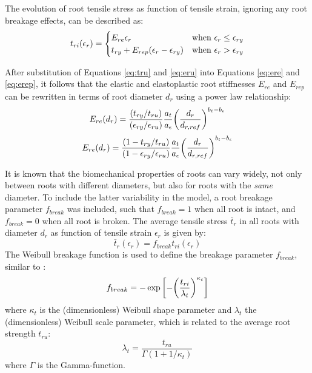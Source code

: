 \documentclass[a4 paper, 11  pt]{article}
\begin{document}
The evolution of root tensile stress as function of tensile strain, ignoring any root breakage effects, can be described as:
\begin{equation}
	t_{ri}(\epsilon_r) = 
	\begin{cases}
		E_{re} \epsilon_r & \text{when } \epsilon_r \leq \epsilon_{ry} \\
		t_{ry} + E_{rep} \qty(\epsilon_r - \epsilon_{ry}) & \text{when } \epsilon_r > \epsilon_{ry}
	\end{cases}
	\label{eq:tri}
\end{equation}

After substitution of Equations \ref{eq:tru} and \ref{eq:eru} into Equations \ref{eq:ere} and \ref{eq:erep}, it follows that the elastic and elastoplastic root stiffnesses $E_{re}$ and $E_{rep}$ can be rewritten in terms of root diameter $d_r$ using a power law relationship:
\begin{equation}
	E_{re}(d_r) = \frac{\qty(t_{ry}/t_{ru})}{\qty(\epsilon_{ry}/\epsilon_{ru})} \frac{a_t}{a_\epsilon} \qty(\frac{d_r}{d_{r,ref}})^{b_t - b_\epsilon}
\end{equation}
\begin{equation}
	E_{re}(d_r) = \frac{\qty(1 - t_{ry}/t_{ru})}{\qty(1 - \epsilon_{ry}/\epsilon_{ru})} \frac{a_t}{a_\epsilon} \qty(\frac{d_r}{d_{r,ref}})^{b_t - b_\epsilon}
\end{equation}

It is known that the biomechanical properties of roots can vary widely, not only between roots with different diameters, but also for roots with the \textit{same} diameter. To include the latter variability in the model, a root breakage parameter $f_{break}$ was included, such that $f_{break}=1$ when all root is intact, and $f_{break}=0$ when all root is broken. The average tensile stress $\bar{t}_r$ in all roots with diameter $d_r$ as function of tensile strain $\epsilon_r$ is given by:
\begin{equation}
	\bar{t}_r(\epsilon_r) = f_{break} t_{ri}(\epsilon_r)
\end{equation}
The Weibull breakage function is used to define the breakage parameter $f_{break}$, similar to \citet{schwarz2013}:
\begin{equation}
	f_{break} = -\exp \qty[-\qty( \frac{t_{ri}}{\lambda_t} )^{\kappa_t} ]
\end{equation}
where $\kappa_t$ is the (dimensionless) Weibull shape parameter and $\lambda_t$ the (dimensionless) Weibull scale parameter, which is related to the average root strength $t_{ru}$:
\begin{equation}
	\lambda_t = \frac{t_{ru}}{\Gamma(1 + 1/\kappa_t)}
	\label{eq:weibullshaperelation}
\end{equation}
where $\Gamma$ is the Gamma-function.
\end{document}
